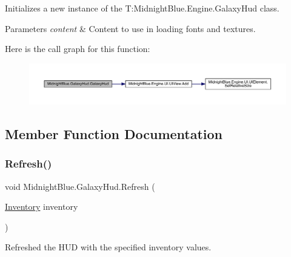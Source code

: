 Initializes a new instance of the T\+:\+Midnight\+Blue.\+Engine.\+Galaxy\+Hud class. 


\begin{DoxyParams}{Parameters}
{\em content} & Content to use in loading fonts and textures.\\
\hline
\end{DoxyParams}
Here is the call graph for this function\+:
\nopagebreak
\begin{figure}[H]
\begin{center}
\leavevmode
\includegraphics[width=350pt]{class_midnight_blue_1_1_galaxy_hud_a6f15257e5bc5bbc67cac3888f075ea29_cgraph}
\end{center}
\end{figure}


\subsection{Member Function Documentation}
\hypertarget{class_midnight_blue_1_1_galaxy_hud_aea2d04b212188a2e729ea327b7da0449}{}\label{class_midnight_blue_1_1_galaxy_hud_aea2d04b212188a2e729ea327b7da0449} 
\subsubsection{\texorpdfstring{Refresh()}{Refresh()}}
{\footnotesize\ttfamily void Midnight\+Blue.\+Galaxy\+Hud.\+Refresh (\begin{DoxyParamCaption}\item[{\hyperlink{class_midnight_blue_1_1_engine_1_1_entity_component_1_1_inventory}{Inventory}}]{inventory }\end{DoxyParamCaption})\hspace{0.3cm}{\ttfamily [inline]}}



Refreshed the H\+UD with the specified inventory values. 


